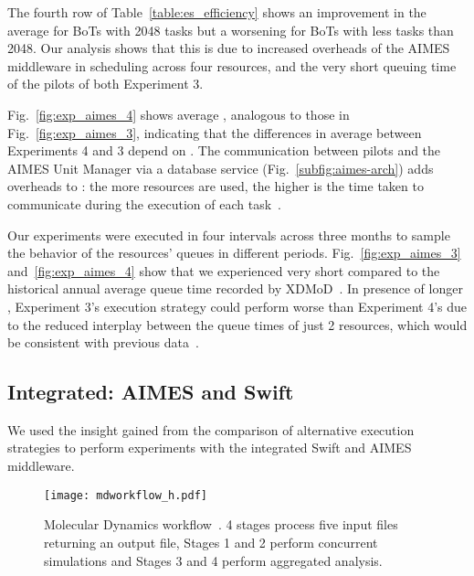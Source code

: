\documentclass[10pt, conference, compsocconf]{IEEEtran}
\begin{document}
The fourth row of Table~\ref{table:es_efficiency} shows an improvement in the
average  for BoTs with 2048 tasks but a worsening for BoTs with
less tasks than 2048. Our analysis shows that this is due to increased
overheads of the AIMES middleware in scheduling across four resources, and
the very short queuing time of the pilots of both Experiment 3.

Fig.~\ref{fig:exp_aimes_4} shows average , analogous to those in
Fig.~\ref{fig:exp_aimes_3}, indicating that the differences in average
 between Experiments 4 and 3 depend on . The communication
between pilots and the AIMES Unit Manager via a database service
(Fig.~\ref{subfig:aimes-arch}) adds overheads to : the more resources
are used, the higher is the time taken to communicate during the execution of
each task~\cite{merzky2015radical}.

Our experiments were executed in four intervals across three months to sample
the behavior of the resources' queues in different periods.
Fig.~\ref{fig:exp_aimes_3} and~\ref{fig:exp_aimes_4} show that we experienced
very short  compared to the historical annual average queue time
recorded by XDMoD~\cite{xdmod_url}. In presence of longer , Experiment
3's execution strategy could perform worse than Experiment 4's due to the
reduced interplay between the queue times of just 2 resources, which would be
consistent with previous data~\cite{turilli2016integrating}.

\subsection{Integrated: AIMES and Swift}\label{ssec:exp_integration}

We used the insight gained from the comparison of alternative execution
strategies to perform experiments with the integrated Swift and AIMES
middleware.

\begin{figure}
  \centering
  \texttt{[image: mdworkflow\_h.pdf]}
  \caption{Molecular Dynamics workflow~\cite{balasubramanian2016ensemble}. 4
    stages process five input files returning an output file, Stages 1 and 2
    perform concurrent simulations and Stages 3 and 4 perform aggregated
    analysis.}\label{fig:workflow}
\end{figure}
\end{document}
